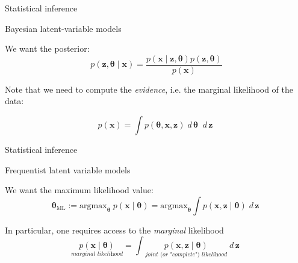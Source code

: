 \documentclass[10pt]{beamer}
\newcommand{\ds}{\displaystyle}
\newcommand{\df}{\displaystyle\frac}
\newcommand{\+}[1]{\ensuremath{{\boldsymbol #1}}} %
\newcommand{\cond}{\; | \;}
\newcommand{\wrt}[1]{\; d \,{#1} \;}
\newcommand{\explainterm}[2]{\underset{\textit{#1}}{#2}}
\begin{document}
\begin{frame}{Statistical inference}

\begin{block}{Bayesian latent-variable models}

We want the posterior:
\[ p(\+z, \+\theta \cond \+x) =  \df{p(\+x \cond  \+z, \+\theta ) p(\+z, \+\theta )}{p(\+x)} \]

Note that we need to compute the \textit{evidence}, i.e. the marginal likelihood of the data:  

	\begin{equation}
	 p(\+x) = \ds\int p(\+\theta,\+x, \+z) \wrt{\+\theta} \wrt{\+z} 
	 \end{equation}
\end{block} 

\end{frame}


\begin{frame}{Statistical inference}

\begin{block}{Frequentist latent variable models}

We want the maximum likelihood value:
\begin{equation}
\+\theta_{\text{ML}}:=  \text{argmax}_{\+\theta} \; p (\+x \cond \+\theta) = \text{argmax}_{\+\theta} \ds\int p(\+x,\+z \cond \+\theta) \wrt{\+z} 
\end{equation}

In particular, one requires access to the \textit{marginal} likelihood
\begin{equation}
\explainterm{marginal likelihood}{p(\+x \cond \+\theta)} = \ds\int \explainterm{joint (or "complete") likelihood}{p(\+x,\+z \cond \+\theta)} \wrt{\+z} 
\label{marginal_likelihood}
\end{equation}

\end{block} 

\end{frame}

\end{document}
